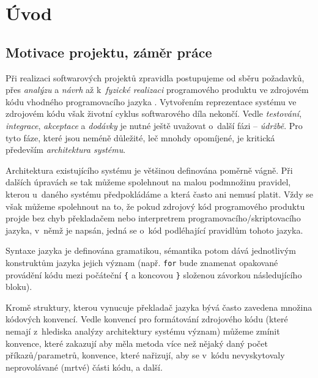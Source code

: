 \chapter{Úvod}

\section{Motivace projektu, záměr práce}
\label{introduction-motivation}

Při realizaci softwarových projektů zpravidla postupujeme od sběru požadavků, přes \emph{analýzu} a \emph{návrh} až k~\emph{fyzické realizaci} programového produktu ve zdrojovém kódu vhodného programovacího jazyka \cite{wiki:sdlc}. Vytvořením reprezentace systému ve zdrojovém kódu však životní cyklus softwarového díla nekončí. Vedle \emph{testování}, \emph{integrace}, \emph{akceptace} a \emph{dodávky} je nutné ještě uvažovat o~další fázi -- \emph{údržbě}. Pro tyto fáze, které jsou neméně důležité, leč mnohdy opomíjené, je kritická především \emph{architektura systému}.

Architektura existujícího systému je většinou definována poměrně vágně. Při dalších úpravách se tak můžeme spolehnout na malou podmnožinu pravidel, kterou u~daného systému předpokládáme a která často ani nemusí platit. Vždy se však můžeme spolehnout na to, že pokud zdrojový kód programového produktu projde bez chyb překladačem nebo interpretrem programovacího/skriptovacího jazyka, v~němž je napsán, jedná se o~kód podléhající pravidlům tohoto jazyka.

Syntaxe jazyka je definována gramatikou, sémantika potom dává jednotlivým konstruktům jazyka jejich význam (např. \verb+for+ bude znamenat opakované provádění kódu mezi počáteční \verb+{+ a koncovou \verb+}+ složenou závorkou následujícího bloku).

Kromě struktury, kterou vynucuje překladač jazyka bývá často zavedena množina kódových konvencí. Vedle konvencí pro formátování zdrojového kódu (které nemají z~hlediska analýzy architektury systému význam) můžeme zmínit konvence, které zakazují aby měla metoda více než nějaký daný počet příkazů/parametrů, konvence, které nařizují, aby se v~kódu nevyskytovaly neprovolávané (mrtvé) části kódu, a další.

